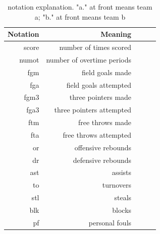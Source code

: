 \documentclass{article} %
\begin{document}
\begin{table}[H]
\centering
{\small
\begin{tabular}{rrrrr}
  \hline
 Notation & Meaning \\ 
  \hline
  score & number of times scored \\
  numot & number of overtime periods \\
  fgm  & field goals made \\ 
  fga  & field goals attempted \\ 
  fgm3 &  three pointers made \\ 
  fga3 &  three pointers attempted \\ 
  ftm &  free throws made \\ 
  fta &  free throws attempted \\
  or & offensive rebounds \\
  dr & defensive rebounds \\
  ast & assists \\
  to & turnovers \\
  stl &  steals \\
  blk & blocks \\
  pf & personal fouls \\
   \hline
\end{tabular}
}
\caption{notation explanation. "a." at front means team a; "b." at front means team b} 
\end{table}
\end{document}
